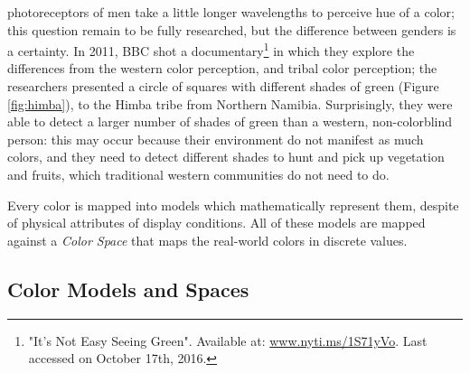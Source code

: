 photoreceptors of men take a little longer wavelengths to perceive hue of a color; this question remain
to be fully researched, but the difference between genders is a certainty. In 2011, BBC shot a
documentary\footnote{\label{itsnoteasy}"It's Not Easy Seeing Green". Available at:
\url{www.nyti.ms/1S71yVo}.
Last accessed on October 17th, 2016.} in which they explore the differences from the western color
perception, and tribal color perception; the researchers presented a circle of squares with different
shades of green (Figure \ref{fig:himba}), to the Himba tribe from Northern Namibia. Surprisingly, they were able to detect a larger
number of shades of green than a western, non-colorblind person: this may occur because their environment do not
manifest as much colors, and they need to detect different shades to hunt and pick up vegetation and
fruits, which traditional western communities do not need to do. \\ \par
%
Every color is mapped into models which mathematically represent them, despite of physical attributes of display conditions.
All of these models are mapped against a \emph{Color Space} that maps the real-world colors in discrete values.
%
%
\subsection{Color Models and Spaces}
\label{subsec:colormodelspaces}
%
